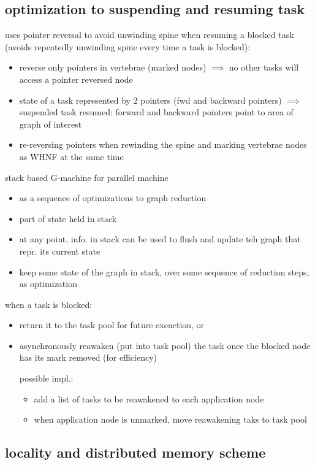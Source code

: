 \documentclass[8pt]{extarticle}
\begin{document}
\begin{multicols*}{2}
\subsection{optimization to suspending and resuming task}

uses pointer reversal to avoid unwinding spine when resuming a blocked task (avoids repeatedly unwinding spine every time a task is blocked):
\begin{itemize}
\item reverse only pointers in vertebrae (marked nodes) $\implies$ no other tasks will access a pointer reversed node
\item state of a task represented by 2 pointers (fwd and backward pointers) $\implies$ suspended task resumed: forward and backward pointers point to area of graph of interest
\item re-reversing pointers when rewinding the spine and marking vertebrae nodes as WHNF at the same time
\end{itemize}

stack based G-machine for parallel machine
\begin{itemize}
\item as a sequence of optimizations to graph reduction
\item part of state held in stack
\item at any point, info. in stack can be used to flush and update teh graph that repr. its current state
\item keep some state of the graph in stack, over some sequence of reduction steps, as optimization
\end{itemize}


when a task is blocked:
\begin{itemize}
\item return it to the task pool for future exeuction, or
\item asynchronously reawaken (put into task pool) the task once the blocked node has its mark removed (for efficiency)

  possible impl.:
  \begin{itemize}
  \item add a list of tasks to be reawakened to each application node
  \item when application node is unmarked, move reawakening taks to task pool
  \end{itemize}
\end{itemize}

\subsection{locality and distributed memory scheme}


\end{multicols*}
\end{document}
